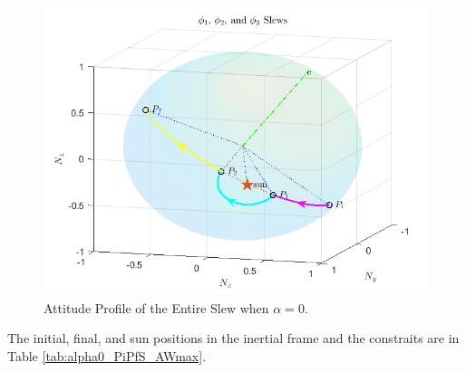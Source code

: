 \documentclass[letterpaper, preprint, paper,11pt]{AAS}	%
\begin{document}
			\begin{figure}[H]
			\begin{center}
				\includegraphics[width=4.75in]{figures/alpha0/phi1_phi2_phi3.png}
				\caption{Attitude Profile of the Entire Slew when $\alpha=0$.}
			\end{center}
			\label{fig:phi1_phi2_phi3_alpha0}
			\end{figure}	
		
The initial, final, and sun positions in the inertial frame and the constraits are in Table \ref{tab:alpha0_PiPfS_AWmax}. 
			
\end{document}
